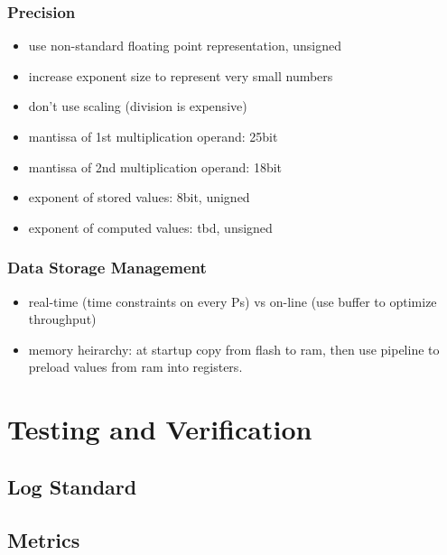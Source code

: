 \documentclass[mscthesis]{usiinfthesis}
\begin{document}
\subsection{Precision}
\label{ch:acc_prec}

\begin{itemize}
    \item use non-standard floating point representation, unsigned
    \item increase exponent size to represent very small numbers
    \item don't use scaling (division is expensive)
    \item mantissa of 1st multiplication operand: 25bit
    \item mantissa of 2nd multiplication operand: 18bit
    \item exponent of stored values: 8bit, unigned
    \item exponent of computed values: tbd, unsigned
\end{itemize}

\subsection{Data Storage Management}
\label{ch:acc_mem}

\begin{itemize}
    \item real-time (time constraints on every Ps) vs on-line (use buffer to
        optimize throughput)
    \item memory heirarchy: at startup copy from flash to ram, then use pipeline
        to preload values from ram into registers.
\end{itemize}

\chapter{Testing and Verification}
\label{ch:test}
\section{Log Standard}
\label{ch:test_log}
\section{Metrics}
\label{ch:test_log}
\end{document}
